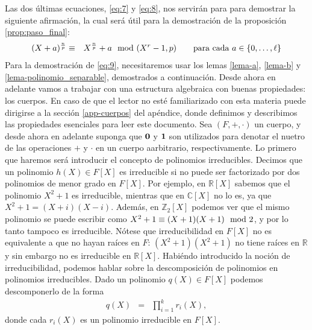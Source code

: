 		Las dos últimas ecuaciones, \eqref{eq:7} y \eqref{eq:8}, nos servirán para para demostrar la siguiente afirmación, la cual será útil para la demostración de la proposición \ref{prop:paso_final}:
	\begin{eqnarray}
		(X+a)^{\frac{n}{p}}&\equiv &X^{\frac{n}{p}}+a\mod (X^r-1,p) \quad\quad \text{para cada } a \in \{0, \ldots, \ell\}  \label{eq:9}
	\end{eqnarray}
	Para la demostración de \eqref{eq:9}, necesitaremos usar los lemas \ref{lema-a}, \ref{lema-b} y \ref{lema-polinomio_separable}, demostrados a continuación. %
Desde ahora en adelante vamos a trabajar con una estructura algebraica con buenas propiedades: los cuerpos. En caso de que el lector no esté familiarizado con esta materia puede dirigirse a la sección \ref{app-cuerpos} del apéndice, donde definimos y describimos las propiedades esenciales para leer este documento. Sea $(F,+,\cdot)$ un cuerpo, y desde ahora en adelante suponga que $\mathbf{0}$ y $\mathbf{1}$ son utilizados para denotar el nuetro de las operaciones $+$ y $\cdot$ en un cuerpo aarbitrario, respectivamente. Lo primero que haremos será introducir el concepto de polinomios irreducibles. Decimos que un polinomio $h(X)\in F[X]$ es irreducible si no puede ser factorizado por dos polinomios de menor grado en $F[X]$. Por ejemplo, en $\mathbb{R}[X]$ sabemos que el polinomio $X^2+1$ es irreducible, mientras que en $\mathbb{C}[X]$ no lo es, ya que $X^2+1 = (X+i)(X-i)$. Además, en $\mathbb{Z}_2[X]$ podemos ver que el mismo polinomio se puede escribir como \mbox{$X^2+1 \equiv (X+1)(X+1) \mod 2$}, y por lo tanto tampoco es irreducible. Nótese que irreducibilidad en $F[X]$ no es equivalente a que no hayan raíces en $F$: $(X^2+1)(X^2+1)$ no tiene raíces en $\mathbb{R}$ y sin embargo no es irreducible en $\mathbb{R}[X]$. Habiéndo introducido la noción de irreducibilidad, podemos hablar sobre la descomposición de polinomios en polinomios irreducibles. Dado un polinomio $q(X)\in F[X]$ podemos descomponerlo de la forma 
\begin{eqnarray}
	q(X) & = & \prod\limits_{i=1}^kr_i(X), \label{descomp pol}
\end{eqnarray}
donde cada $r_i(X)$ es un polinomio irreducible en $F[X]$.
